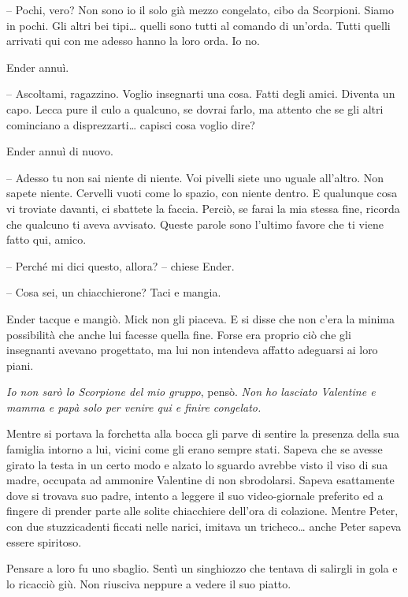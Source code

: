 {-- Pochi, vero? Non sono io il solo già mezzo congelato, cibo da
	Scorpioni. Siamo in pochi. Gli altri bei tipi\ldots{} quelli sono tutti
	al comando di un'orda. Tutti quelli arrivati qui con me adesso hanno la
	loro orda. Io no.}

{Ender annuì.}

{-- Ascoltami, ragazzino. Voglio insegnarti una cosa. Fatti degli amici.
	Diventa un capo. Lecca pure il culo a qualcuno, se dovrai farlo, ma
	attento che se gli altri cominciano a disprezzarti\ldots{} capisci cosa
	voglio dire?}

{Ender annuì di nuovo.}

{-- Adesso tu non sai niente di niente. Voi pivelli siete uno uguale
	all'altro. Non sapete niente. Cervelli vuoti come lo spazio, con niente
	dentro. E qualunque cosa vi troviate davanti, ci sbattete la faccia.
	Perciò, se farai la mia stessa fine, ricorda che qualcuno ti aveva
	avvisato. Queste parole sono l'ultimo favore che ti viene fatto qui,
	amico.}

{-- Perché mi dici questo, allora? -- chiese Ender.}

{-- Cosa sei, un chiacchierone? Taci e mangia.}

{Ender tacque e mangiò. Mick non gli piaceva. E si disse che non c'era
	la minima possibilità che anche lui facesse quella fine. Forse era
	proprio ciò che gli insegnanti avevano progettato, ma lui non intendeva
	affatto adeguarsi ai loro piani.}

\emph{{Io non sarò lo Scorpione del mio gruppo}}{, \emph{} pensò.
	\emph{Non ho lasciato Valentine e mamma e papà solo per venire qui e
		finire congelato.}}

{Mentre si portava la forchetta alla bocca gli parve di sentire la
	presenza della sua famiglia intorno a lui, vicini come gli erano sempre
	stati. Sapeva che se avesse girato la testa in un certo modo e alzato lo
	sguardo avrebbe visto il viso di sua madre, occupata ad ammonire
	Valentine di non sbrodolarsi. Sapeva esattamente dove si trovava suo
	padre, intento a leggere il suo video-giornale preferito ed a fingere di
	prender parte alle solite chiacchiere dell'ora di colazione. Mentre
	Peter, con due stuzzicadenti ficcati nelle narici, imitava un
	tricheco\ldots{} anche Peter sapeva essere spiritoso.}

{Pensare a loro fu uno sbaglio. Sentì un singhiozzo che tentava di
	salirgli in gola e lo ricacciò giù. Non riusciva neppure a vedere il suo
	piatto.}

